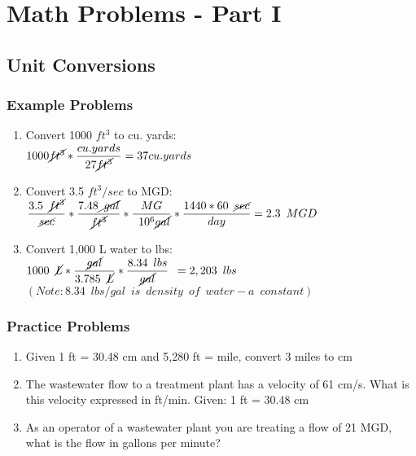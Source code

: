 
\chapter{Math Problems - Part I}

\section{Unit Conversions}
\subsection{Example Problems}   
\begin{enumerate}
\item Convert 1000 $ft^3$ to cu. yards:\\
$1000 \cancel{ft^3}*\dfrac{cu.yards}{27\cancel{ft^3}} = 37 cu.yards$\\

\item Convert 3.5 $ft^3/sec$ to MGD:\\
$\dfrac{3.5 \enspace \cancel{ft^3}}{\cancel{sec}} * \dfrac{7.48\cancel {\enspace gal}}{\cancel{ft^3}} * \dfrac{MG}{\enspace 10^6 \cancel{gal}}* \dfrac{1440*60 \enspace \cancel{sec}}{day}=  2.3 \enspace MGD$\\

\item Convert 1,000 L water to lbs:\\
$1000 \enspace \cancel{L}*\dfrac {\cancel{gal}}{3.785 \enspace \cancel{L}}*\dfrac{8.34 \enspace lbs}{\cancel{gal}}\enspace  = 2,203 \enspace lbs$\\
$(Note:8.34 \enspace lbs/gal \enspace is \enspace density \enspace of \enspace water - a \enspace constant)$\\ 
\end{enumerate}


\subsection{Practice Problems} 
\begin{enumerate}
\item Given 1 ft = 30.48 cm and 5,280 ft = mile, convert 3 miles to cm\\


\item The wastewater flow to a treatment plant has a velocity of 61 cm/s. What is this velocity expressed in ft/min. Given: 1 ft = 30.48 cm\\

\item As an operator of a wastewater plant you are treating a flow of 21 MGD, what is the flow in gallons per minute?\\
\end{enumerate}

